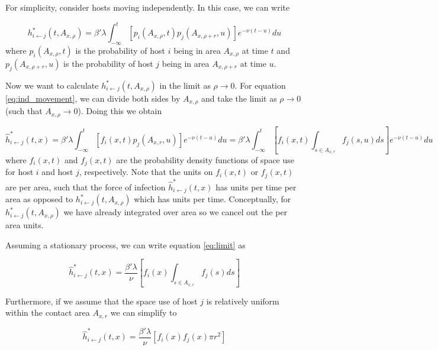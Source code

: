 \documentclass[11pt]{article}
\begin{document}
For simplicity, consider hosts moving independently. In this case, we can write

\begin{equation}
    h^*_{i \leftarrow j}(t, A_{x, \rho}) = \beta' \lambda \int_{-\infty}^{t} [p_i(A_{x, \rho}, t) p_j(A_{x, \rho + r}, u)] e^{-\nu(t - u)} du
    \label{eq:ind_movement}
\end{equation}
where $p_i(A_{x, \rho}, t)$ is the probability of host $i$ being in area $A_{x, \rho}$ at time $t$ and $p_j(A_{x, \rho + r}, u)$ is the probability of host $j$ being in area $A_{x, \rho + r}$ at time $u$.

Now we want to calculate $h^*_{i \leftarrow j}(t, A_{x, \rho})$ in the limit as $\rho \rightarrow 0$. For equation \ref{eq:ind_movement}, we can divide both sides by $A_{x, \rho}$ and take the limit as $\rho \rightarrow 0$ (such that $A_{x, \rho} \rightarrow 0$). Doing this we obtain

\begin{equation}
    \hat{h}^*_{i \leftarrow j}(t, x) = \beta' \lambda \int_{-\infty}^{t} [f_i(x, t) p_j(A_{x, r}, u)] e^{-\nu(t - u)} du = \beta' \lambda \int_{-\infty}^{t} [f_i(x, t) \int_{s \in A_{x, r}} f_j(s, u) ds] e^{-\nu(t - u)} du
    \label{eq:limit}
\end{equation}
where $f_i(x, t)$ and $f_j(x, t)$ are the probability density functions of space use for host $i$ and host $j$, respectively.  Note that the units on $f_i(x, t)$ or $f_j(x, t)$ are per area, such that the force of infection $\hat{h}^*_{i \leftarrow j}(t, x)$ has units per time per area as opposed to $h^*_{i \leftarrow j}(t, A_{x, \rho})$ which has units per time. Conceptually, for $h^*_{i \leftarrow j}(t, A_{x, \rho})$ we have already integrated over area so we cancel out the per area units.  

Assuming a stationary process, we can write equation \ref{eq:limit} as

\begin{equation}
    \hat{h}^*_{i \leftarrow j}(t, x) =  \frac{\beta' \lambda}{\nu} [f_i(x) \int_{s \in A_{x, r}} f_j(s) ds]
\end{equation}

Furthermore, if we assume that the space use of host $j$ is relatively uniform within the contact area $A_{x, r}$ we can simplify to

\begin{equation}
    \hat{h}^*_{i \leftarrow j}(t, x) =  \frac{\beta' \lambda}{\nu} [f_i(x) f_j(x) \pi r^2]
\end{equation}
\end{document}
